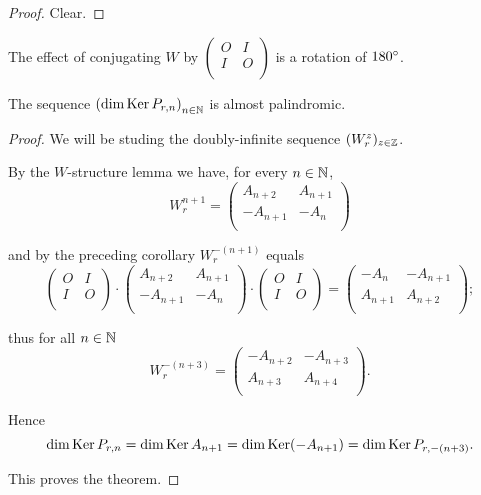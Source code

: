 \begin{proof}
  Clear.
\end{proof}

\begin{remark}
  The effect of conjugating $W$ by
  $\left(\begin{smallmatrix} O & I \\ I & O \\\end{smallmatrix}\right)$
  is a rotation of $180^{\circ}$.
\end{remark}

\begin{theorem}
  The sequence $\left(\dim\operatorname{Ker} P_{r,n}\right)_{n\in\mathbb{N}}$
  is almost palindromic.
\end{theorem}

\begin{proof}
  We will be studing the doubly-infinite sequence
  $(W_{r}^{z})_{z\in\mathbb{Z}}$.

  By the $W$-structure lemma we have, for every $n\in\mathbb{N}$,
  \[
  W_{r}^{n+1}
  =
  \left(
  \begin{array}{cc}
     A_{n+2} &  A_{n+1} \\
    -A_{n+1} & -A_{n}   \\
  \end{array}
  \right)
  \]

  and by the preceding corollary $W_{r}^{-(n+1)}$ equals
  \[
  \left(
  \begin{array}{cc}
    O & I \\
    I & O \\
  \end{array}
  \right)
  \cdot
  \left(
  \begin{array}{cc}
     A_{n+2} &  A_{n+1} \\
    -A_{n+1} & -A_{n}   \\
  \end{array}
  \right)
  \cdot
  \left(
  \begin{array}{cc}
    O & I \\
    I & O \\
  \end{array}
  \right)
  =
  \left(
  \begin{array}{cc}
    -A_{n}  & -A_{n+1} \\
     A_{n+1} & A_{n+2} \\
  \end{array}
  \right);
  \]

  thus for all $n\in\mathbb{N}$
  \[
  W_{r}^{-(n+3)}
  =
  \left(
  \begin{array}{cc}
    -A_{n+2}  & -A_{n+3} \\
     A_{n+3} & A_{n+4} \\
  \end{array}
  \right).
  \]

  Hence
  \[
  \dim\operatorname{Ker} P_{r,n} =
  \dim\operatorname{Ker} A_{n+1} =
  \dim\operatorname{Ker}(-A_{n+1}) =
  \dim\operatorname{Ker} P_{r,-(n+3)}.
  \]

  This proves the theorem.
\end{proof}
